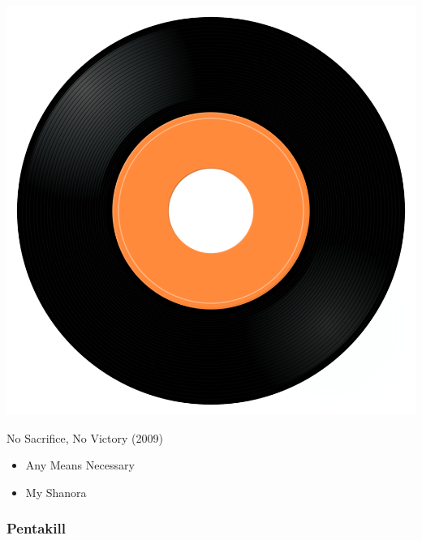 \begin{minipage}[t]{0.25\textwidth}
\captionsetup{type=figure}
\includegraphics[width=\textwidth]{Images/cover.png}
\caption*{No Sacrifice, No Victory (2009)}
\end{minipage}
\begin{minipage}[t]{0.25\textwidth}\vspace{0pt}
\begin{itemize}[nosep,leftmargin=1em,labelwidth=*,align=left]
	\setlength{\itemsep}{0pt}
	\item Any Means Necessary
	\item My Shanora
\end{itemize}
\end{minipage}

\subsubsection{Pentakill}

